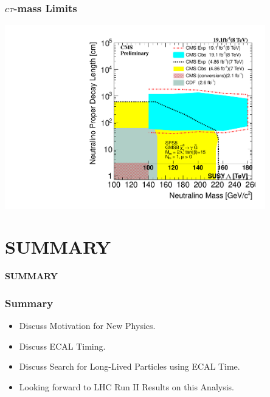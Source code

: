 \documentclass{beamer}
\begin{document}
\begin{frame}
\frametitle{$c\tau$-mass Limits}
 \begin{minipage}[t]{0.8\linewidth}
      \includegraphics[height= 8cm,width=0.8\paperwidth]{THESISPLOTS/Neutralino_Ctau-Vs-Lambda_2D_exclusion.pdf}
 \end{minipage}
\end{frame}

\section{SUMMARY}
{
\begin{frame}
  \begin{center}
    \textcolor{UMN@Maroon}{\Huge{\textbf{SUMMARY}}}
  \end{center}
\end{frame}
}

\begin{frame}
\frametitle{Summary}
\begin{itemize}
\item Discuss Motivation for New Physics.
\item Discuss ECAL Timing.
\item Discuss Search for Long-Lived Particles using ECAL Time.
\item Looking forward to LHC Run II Results on this Analysis.
\end{itemize}
\end{frame}
\end{document}
